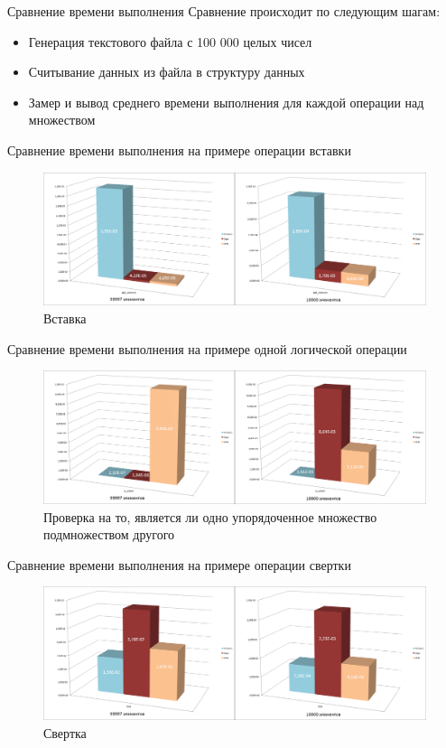 \documentclass{beamer}
\begin{document}
	\begin{frame}{Сравнение времени выполнения}
		Сравнение происходит по следующим шагам:
		\begin{itemize}
			\item Генерация текстового файла с 100 000 целых чисел
			\item Считывание данных из файла в структуру данных
			\item Замер и вывод среднего времени выполнения для каждой операции над множеством
		\end{itemize}
	\end{frame}
	
	\begin{frame}{Сравнение времени выполнения на примере операции вставки}
		\begin{figure}
			\includegraphics[scale=0.18]{img/histograms/add_element.png}
			\caption{Вставка}
		\end{figure}
	\end{frame}
	
	
	\begin{frame}{Сравнение времени выполнения на примере одной логической операции}				
		\begin{figure}
			\includegraphics[scale=0.18]{img/histograms/is_subset.png}
			\caption{Проверка на то, является ли одно упорядоченное множество подмножеством другого}
		\end{figure}
	\end{frame}
	
	
	\begin{frame}{Сравнение времени выполнения на примере операции свертки}
		\begin{figure}
			\includegraphics[scale=0.18]{img/histograms/fold.png}
			\caption{Свертка}
		\end{figure}
	\end{frame}
	
\end{document}
